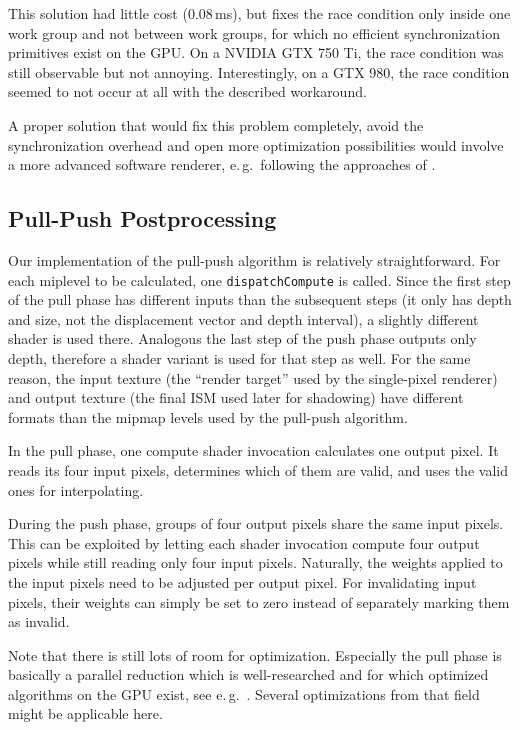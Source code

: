 This solution had little cost (0.08\,ms), but fixes the race condition only inside one work group and not between work groups, for which no efficient synchronization primitives exist on the GPU. On a NVIDIA GTX 750 Ti, the race condition was still observable but not annoying. Interestingly, on a GTX 980, the race condition seemed to not occur at all with the described workaround.

A proper solution that would fix this problem completely, avoid the synchronization overhead and open more optimization possibilities would involve a more advanced software renderer, e.\,g.\ following the approaches of \citet{Laine:2011:SoftwareRasterization}.


\subsection{Pull-Push Postprocessing}
\label{sec:impl:pullPushPostprocessing}

Our implementation of the pull-push algorithm is relatively straightforward. For each miplevel to be calculated, one \texttt{dispatchCompute} is called. Since the first step of the pull phase has different inputs than the subsequent steps (it only has depth and size, not the displacement vector and depth interval), a slightly different shader is used there. Analogous the last step of the push phase outputs only depth, therefore a shader variant is used for that step as well. For the same reason, the input texture (the ``render target'' used by the single-pixel renderer) and output texture (the final ISM used later for shadowing) have different formats than the mipmap levels used by the pull-push algorithm.



In the pull phase, one compute shader invocation calculates one output pixel. It reads its four input pixels, determines which of them are valid, and uses the valid ones for interpolating.


During the push phase, groups of four output pixels share the same input pixels. This can be exploited by letting each shader invocation compute four output pixels while still reading only four input pixels. Naturally, the weights applied to the input pixels need to be adjusted per output pixel. For invalidating input pixels, their weights can simply be set to zero instead of separately marking them as invalid.

Note that there is still lots of room for optimization. Especially the pull phase is basically a parallel reduction which is well-researched and for which optimized algorithms on the GPU exist, see e.\,g.\ \citet{Harris:2007:ParallelReduction}. Several optimizations from that field might be applicable here.



